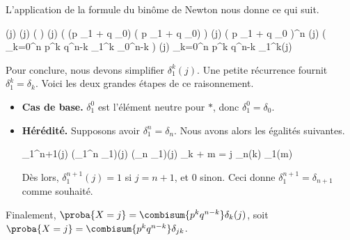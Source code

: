 

L'application de la formule du binôme de Newton nous donne ce qui suit.

\begin{stepcalc}[style=sar]
\explnext{}
	\lawvar(j)
\explnext{}
	\lawvar[X_1 + \cdots + X_n](j)
	( \lawvar[X_1] \ast \cdots \ast \lawvar[X_n] ) (j)
%	
%
\explnext{}
	\big( (p \delta_{1} + q \delta_{0}) \ast \cdots \ast ( p \delta_{1} + q \delta_{0}) \big) (j)
	( p \delta_{1} + q \delta_{0} )^n (j)
\explnext{}
	\big( \dsum_{k=0}^n \combi[n][k] p^k q^{n-k} \delta_{1}^k \ast \delta_{0}^{n-k} \big) (j)
	\dsum_{k=0}^n \combi[n][k] p^k q^{n-k} \delta_{1}^k(j)
\end{stepcalc}


Pour conclure, nous devons simplifier $\delta_{1}^k(j)$.
Une petite récurrence fournit $\delta_{1}^k = \delta_k$.
Voici les deux grandes étapes de ce raisonnement.
%
\begin{itemize}
	\item \textbf{Cas de base.}
	$\delta_{1}^0$ est l'élément neutre pour $\ast$, donc $\delta_{1}^0 = \delta_0$.


	\item \textbf{Hérédité.}
	Supposons avoir $\delta_{1}^n = \delta_n$. Nous avons alors les égalités suivantes.

	\begin{stepcalc}[style=sar]
		\kern-10pt\delta_{1}^{n+1}(j)
	\explnext{}
		(\delta_{1}^{n} \ast \delta_{1})(j)
	\explnext{}
		(\delta_{n} \ast \delta_{1})(j)
	\explnext{}
		\dsum_{k + m = j} \delta_{n}(k) \delta_{1}(m)
	\end{stepcalc}
	
	\noindent
	Dès lors,
	$\delta_{1}^{n+1}(j) = 1$ si $j=n+1$, et $0$ sinon.
	Ceci donne $\delta_{1}^{n+1} = \delta_{n+1}$ comme souhaité.
\end{itemize}


Finalement,
$\proba{X = j} = \combisum{p^k q^{n-k}} \delta_{k}(j)$,
soit
$\proba{X = j} = \combisum{p^k q^{n-k}} \delta_{jk}$.